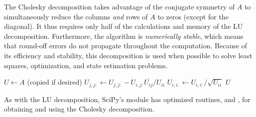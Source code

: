 The Cholesky decomposition takes advantage of the conjugate symmetry of $A$ to simultaneously reduce the columns \emph{and} rows of $A$ to zeros (except for the diagonal).
It thus requires only half of the calculations and memory of the LU decomposition.
Furthermore, the algorithm is \emph{numerically stable}, which means that round-off errors do not propagate throughout the computation.
Because of its efficiency and stability, this decomposition is used when possible to solve least squares, optimization, and state estimation problems.

\begin{algorithm}[H]
\begin{algorithmic}[1]
\State $U \gets A$ (copied if desired)
        \State $U_{j,j:} \gets U_{j,j:} - U_{i,j:}\overline{U_{ij}}/U_{ii}$
    \EndFor
    \State $U_{i,i:} \gets U_{i,i:}/\sqrt{U_{ii}}$
\EndFor
\State {} $U$
\EndProcedure
\end{algorithmic}
\caption{}
\end{algorithm}

As with the LU decomposition, SciPy's  module has optimized routines,  and , for obtaining and using the Cholesky decomposition.

